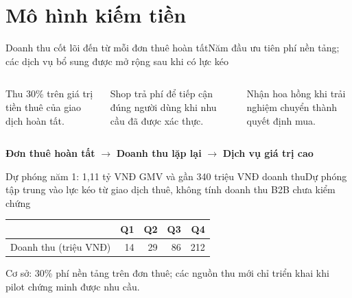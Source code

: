 \section{Mô hình kiếm tiền}

\begin{frame}{Doanh thu cốt lõi đến từ mỗi đơn thuê hoàn tất}{Năm đầu ưu tiên phí nền tảng; các dịch vụ bổ sung được mở rộng sau khi có lực kéo}
  \begin{columns}[T,onlytextwidth]
    \par\vspace{.3em}Thu 30\% trên giá trị tiền thuê của giao dịch hoàn tất.
    \par\vspace{.3em}Shop trả phí để tiếp cận đúng người dùng khi nhu cầu đã được xác thực.
    \par\vspace{.3em}Nhận hoa hồng khi trải nghiệm chuyển thành quyết định mua.
  \end{columns}
  \vfill
  \centering\textbf{Đơn thuê hoàn tất} $\rightarrow$ \textbf{Doanh thu lặp lại} $\rightarrow$ \textbf{Dịch vụ giá trị cao}
\end{frame}

\begin{frame}{Dự phóng năm 1: 1,11 tỷ VNĐ GMV và gần 340 triệu VNĐ doanh thu}{Dự phóng tập trung vào lực kéo từ giao dịch thuê, không tính doanh thu B2B chưa kiểm chứng}
  \centering
  \vspace{1em}
  \small
  \begin{tabularx}{.82\textwidth}{@{}Xrrrr@{}}
    \toprule
    & \textbf{Q1} & \textbf{Q2} & \textbf{Q3} & \textbf{Q4} \\
    \midrule
    Doanh thu (triệu VNĐ) & 14 & 29 & 86 & 212 \\
    \bottomrule
  \end{tabularx}
  \par\vspace{.65em}
  \scriptsize\color{cookieMuted}Cơ sở: 30\% phí nền tảng trên đơn thuê; các nguồn thu mới chỉ triển khai khi pilot chứng minh được nhu cầu.
\end{frame}

